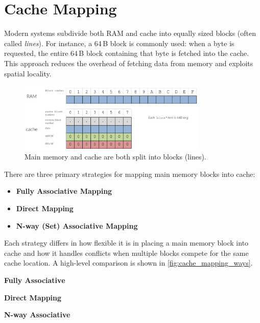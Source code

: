 \section{Cache Mapping}

Modern systems subdivide both RAM and cache into equally sized blocks (often called \textit{lines}). For instance, a 64\,B block is commonly used: when a byte is requested, the entire 64\,B block containing that byte is fetched into the cache. This approach reduces the overhead of fetching data from memory and exploits spatial locality.

\begin{figure}[H]
    \centering
    \includegraphics[width=0.8\textwidth]{assets/cache_mapping.png}
    \caption{Main memory and cache are both split into blocks (lines).}\label{fig:cache_mapping}
\end{figure}

There are three primary strategies for mapping main memory blocks into cache:

\begin{itemize}
    \item \textbf{Fully Associative Mapping}
    \item \textbf{Direct Mapping}
    \item \textbf{N-way (Set) Associative Mapping}
\end{itemize}

Each strategy differs in how flexible it is in placing a main memory block into cache and how it handles conflicts when multiple blocks compete for the same cache location. A high-level comparison is shown in \cref{fig:cache_mapping_ways}.

\begin{center}
    \begin{minipage}{0.2\textwidth}
        \centering
        \small
        \textbf{Fully Associative}
    \end{minipage}%
    \hspace{0.55em}
    \begin{minipage}{0.2\textwidth}
        \centering
        \small
        \textbf{Direct Mapping}
    \end{minipage}%
    \hspace{0.55em}
    \begin{minipage}{0.2\textwidth}
        \centering
        \small
        \textbf{N-way Associative}
    \end{minipage}
    \hspace{0.3em}
\end{center}

